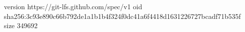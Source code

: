 version https://git-lfs.github.com/spec/v1
oid sha256:3c93e890c66b792de1a1b1b4f324f0dc41a6f4418d1631226727bcadf71b535f
size 349692
